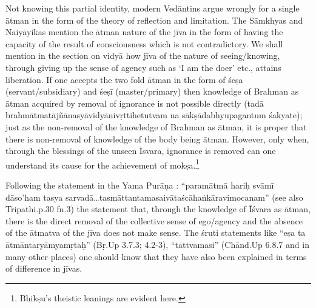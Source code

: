 Not knowing this partial identity, modern Vedāntins argue wrongly for a single ātman in the form of the theory of reflection and limitation. The Sāmkhyas and Naiyāyikas mention the ātman nature of the jīva in the form of having the capacity of the result of consciousness which is not contradictory. We shall mention in the section on vidyā how jīva of the nature of seeing/knowing, through giving up the sense of agency such as ‘I am the doer’ etc., attains liberation. If one accepts the two fold ātman in the form of śeṣa (servant/subsidiary) and śeṣī (master/primary) then knowledge of Brahman as ātman acquired by removal of ignorance is not possible directly (tadā brahmātmatājñānasyāvidyānivṛttihetutvam na sākṣādabhyupagantum śakyate); just as the non-removal of the knowledge of Brahman as ātman, it is proper that there is non-removal of knowledge of the body being ātman. However, only when, through the blessings of the unseen Īsvara, ignorance is removed can one understand its cause for the achievement of mokṣa.\footnote{Bhikṣu's theistic leanings are evident here.} 

Following the statement in the Yama Purāṇa : “paramātmā hariḥ svāmī dāso’ham tasya sarvadā…tasmāttantamasaivātaścāhaṅkāravimoca\-nam” (see also Tripathi.p.30 fn.3) the statement that, through the knowledge of Īśvara as ātman, there is the direct removal of the collective sense of ego/agency and the absence of the ātmatva of the jīva does not make sense. The śruti statements like “eṣa ta ātmāntaryāmyamṛtaḥ” (Bṛ.Up 3.7.3; 4.2-3), “tattvamasi” (Chānd.Up 6.8.7 and in many other places) one should know that they have also been explained in terms of difference in jīvas.


